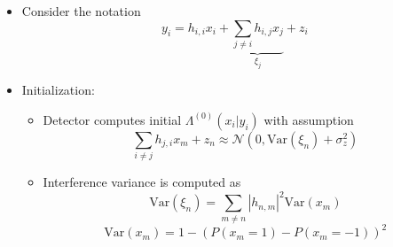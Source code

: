 \documentclass[xcolor=dvipsnames,aspectratio=169]{beamer}
\begin{document}
{\begin{itemize}
\begin{itemize}
     
     \item Example: Systematic block code $\cc=\left[\I_K;\Pb_{K,N-K}\right]\bb=\left[\bb; \s\right]$        
     \item Tanner Graph (Hamming 4/7)
     \begin{figure}
     \end{figure}
        \item Direct part: $\textcolor{KYJade}{\Lambda_E^{(i)}(y_{_{1\dots K}}|\bb)}\leftarrow \max_{\bb} \Lambda^{(i)}(y_{_{1\dots K}}|\bb)\textnormal{ s.t. }\textcolor{VCobalt}{\Lambda_{A|y_{_{K+1\dots N}}}^{(i-1)}(\bb)}$
        \item Parity check: $\textcolor{VCobalt}{\Lambda_E^{(i)}(y_{_{K+1\dots N}}|\bb)}\leftarrow \max_{\bb} \Lambda^{(i)}(y_{_{K+1\dots N}}|\bb)\textnormal{ s.t. }\textcolor{KYJade}{\Lambda_{A|y_{_{1\dots K}}}^{(i-1)}(\bb)}$\\ \ \\
        \item \textbf{Parrallel} $y_{_{1\dots K}}=T_1(\bb)$ and $y_{_{K+1\dots N}}=T_2(\s)=T_2(\Pb\bb)$\\ \ \\
        \item  $\hat{f}^{(i)}(\bb|y_{_{1\dots K}})$ and $\hat{f}^{(i)}(\bb|y_{_{K+1\dots N}})$ not equip. even if $f(\bb)$ is
        
    \end{itemize}   
          
          \pagebreak
          \item Consider the notation
          $$y_i=h_{i,i}x_{i}+\underset{\xi_j}{\underbrace{\sum_{j\neq i}h_{i,j}x_{j}}}+z_i$$
          \item Initialization:          
            \begin{itemize}
             \item Detector computes initial $\Lambda^{(0)}(x_i|y_i)$ with assumption 
          $$\sum_{i\neq j}h_{j,i}x_{m}+z_n\approx\mathcal{N}(0,\mathrm{Var}(\xi_n)+\sigma^2_z)$$
            \item Interference variance is computed as
                $$\mathrm{Var}(\xi_n)=\sum_{m\neq n}|h_{n,m}|^2\mathrm{Var}(x_{m})$$          
                $$\mathrm{Var}(x_{m})=1-(P(x_m=1)-P(x_m=-1))^2$$
            \end{itemize}
            \pagebreak
            

\end{itemize}}
\end{document}
